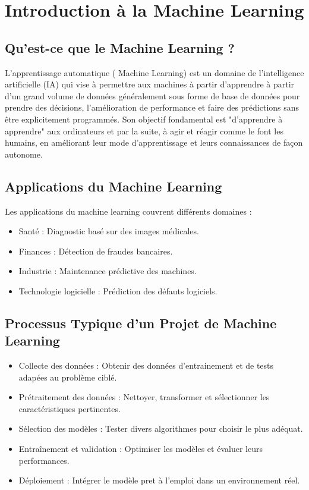 \chapter{Introduction à la Machine Learning}
\label{chap:ml}

\section{Qu’est-ce que le Machine Learning ?}
\label{sec:ml}
L’apprentissage automatique ( Machine Learning) est un domaine de l’intelligence artificielle (IA) qui vise à
permettre aux machines à partir d’apprendre à partir d’un grand volume de données généralement sous forme de base de données pour prendre des décisions, l’amélioration de performance et faire des prédictions sans être explicitement programmés. Son objectif fondamental est "d’apprendre à apprendre" aux ordinateurs et par la suite, à agir et réagir comme le font les humains, en améliorant leur mode d'apprentissage et leurs connaissances de façon autonome.


\section{Applications du Machine Learning}
\label{sec:applications}
Les applications du machine learning couvrent différents domaines :
\begin{itemize}
    \item Santé : Diagnostic basé sur des images médicales.
    \item Finances : Détection de fraudes bancaires.
    \item Industrie : Maintenance prédictive des machines.
    \item Technologie logicielle : Prédiction des défauts logiciels.
\end{itemize}

\section{Processus Typique d’un Projet de Machine Learning}
\label{sec:processus}
\begin{itemize}
    \item Collecte des données : Obtenir des données d’entrainement et de tests adapées au problème ciblé.
    \item Prétraitement des données : Nettoyer, transformer et sélectionner les caractéristiques pertinentes.
    \item Sélection des modèles : Tester divers algorithmes pour choisir le plus adéquat.
    \item Entraînement et validation : Optimiser les modèles et évaluer leurs performances.
    \item Déploiement : Intégrer le modèle pret à l’emploi dans un environnement réel.
\end{itemize}